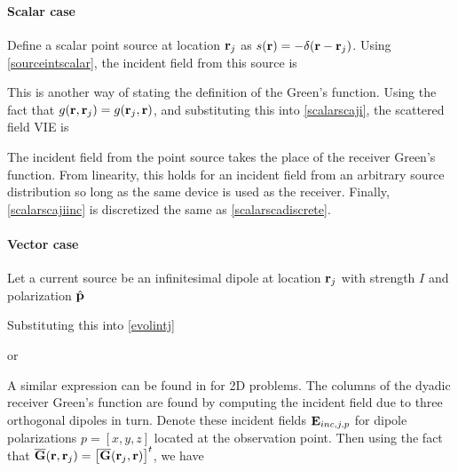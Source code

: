 \paragraph{Scalar case}

Define a scalar point source at location $\mathbf{r}_j$ as $s(\mathbf{r}) = -\delta(\mathbf{r} - \mathbf{r}_j)$. Using \eqref{sourceintscalar}, the incident field from this source is

This is another way of stating the definition of the Green's function. Using the fact that $g(\mathbf{r},\mathbf{r}_j) = g(\mathbf{r}_j,\mathbf{r})$, and substituting this into \eqref{scalarscaji}, the scattered field VIE is

The incident field from the point source takes the place of the receiver Green's function. From linearity, this holds for an incident field from an arbitrary source distribution so long as the same device is used as the receiver. Finally, \eqref{scalarscajiinc} is discretized the same as \eqref{scalarscadiscrete}. 

\paragraph{Vector case}

Let a current source be an infinitesimal dipole at location $\mathbf{r}_j$ with strength $I$ and polarization $\hat{\mathbf{p}}$

Substituting this into \eqref{evolintj}

or

A similar expression can be found in \cite{cui2004study} for 2D problems. The columns of the dyadic receiver Green's function are found by computing the incident field due to three orthogonal dipoles in turn. Denote these incident fields $\mathbf{E}_{inc,j,p}$ for dipole polarizations $p = [x, y, z]$ located at the observation point. Then using the fact that $\overline{\mathbf{G}}(\mathbf{r},\mathbf{r}_j) = \left[ \overline{\mathbf{G}}(\mathbf{r}_j,\mathbf{r})\right]^{t}$, we have

